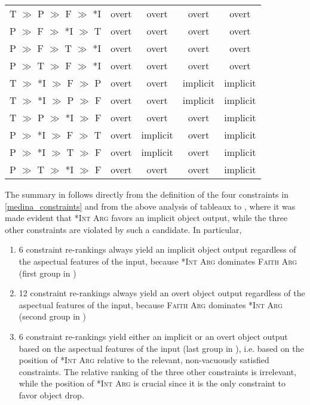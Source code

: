 \begin{table}[htb]
\begin{tabular}{|l||c|c|c|c|}
T $\gg$ P $\gg$ F $\gg$ *I & overt  &  overt   & overt  & overt \\
P $\gg$ F $\gg$ *I $\gg$ T & overt  &  overt   & overt  & overt \\
P $\gg$ F $\gg$ T $\gg$ *I & overt  &  overt   & overt  & overt \\
P $\gg$ T $\gg$ F $\gg$ *I & overt  &  overt   & overt  & overt \\\hline
T $\gg$ *I $\gg$ F $\gg$ P & overt  &  overt   & implicit  & implicit \\
T $\gg$ *I $\gg$ P $\gg$ F & overt  &  overt   & implicit  & implicit \\ 
T $\gg$ P $\gg$ *I $\gg$ F & overt  &  overt   & overt  & implicit \\
P $\gg$ *I $\gg$ F $\gg$ T & overt  &  implicit   & overt  & implicit \\
P $\gg$ *I $\gg$ T $\gg$ F & overt  &  implicit   & overt  & implicit \\
P $\gg$ T $\gg$ *I $\gg$ F & overt  &  overt   & overt  & implicit \\\hline
\end{tabular}
\end{table}

The summary in  follows directly from the definition of the four constraints in \ref{medina_constraints} and from the above analysis of tableaux  to , where it was made evident that \textsc{*Int Arg} favors an implicit object output, while the three other constraints are violated by such a candidate. In particular,
\begin{enumerate}
    \item 6 constraint re-rankings always yield an implicit object output regardless of the aspectual features of the input, because \textsc{*Int Arg} dominates \textsc{Faith Arg} (first group in )
    \item 12 constraint re-rankings always yield an overt object output regardless of the aspectual features of the input, because \textsc{Faith Arg} dominates \textsc{*Int Arg} (second group in )
    \item 6 constraint re-rankings yield either an implicit or an overt object output based on the aspectual features of the input (last group in ), i.e. based on the position of \textsc{*Int Arg} relative to the relevant, non-vacuously satisfied constraints. The relative ranking of the three other constraints is irrelevant, while the position of \textsc{*Int Arg} is crucial since it is the only constraint to favor object drop.
\end{enumerate}

